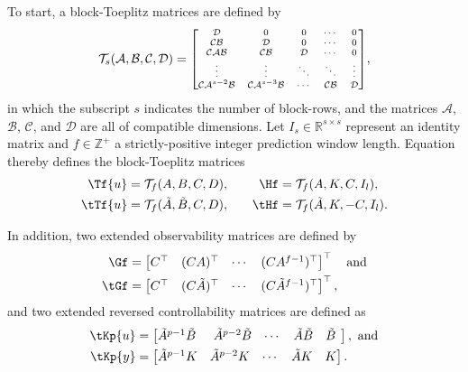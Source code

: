 To start, a block-Toeplitz matrices are defined by
\begin{align}\label{eqn:blockToeplitz} 
\mathcal{T}_s(\mathcal{A},\mathcal{B},\mathcal{C},\mathcal{D}) =\scriptsize{
	\begin{bmatrix}
		\mathcal{D}         & 0         & 0      & \cdots  & 0\\
		\mathcal{C}\mathcal{B}        & \mathcal{D}         & 0      & \cdots  & 0\\
		\mathcal{C}\mathcal{A}\mathcal{B}       & \mathcal{C}\mathcal{B}        & \mathcal{D}      & \cdots & 0\\
		\vdots    &  \vdots & \ddots & \ddots & \vdots\\
		\mathcal{C}\mathcal{A}^{s-2}\mathcal{B} & \mathcal{C}\mathcal{A}^{s-3}\mathcal{B} & \cdots  & \mathcal{C}\mathcal{B}     & \mathcal{D}
	\end{bmatrix}},
\end{align}
in which the subscript $s$ indicates the number of block-rows, and the matrices $\mathcal{A}$, $\mathcal{B}$, $\mathcal{C}$, and $\mathcal{D}$ are all of compatible dimensions. Let $I_s\in\mathbb{R}^{s\times s}$ represent an identity matrix and $f\in\mathbb{Z}^+$ a strictly-positive integer prediction window length. Equation~ thereby defines the block-Toeplitz matrices
\begin{alignat*}{2}
\Tf{u}&=\mathcal{T}_f(A,B,C,D),\quad  &\Hf&=\mathcal{T}_f(A,K,C,I_l),\\
\tTf{u}&=\mathcal{T}_f(\tilde{A},\tilde{B},C,D),\quad  &\tHf&=\mathcal{T}_f(\tilde{A},K,-C,I_l).
\end{alignat*}

In addition, two extended observability matrices are defined by
\begin{align*}
\Gf &= \begin{bmatrix}C^\top & (CA)^\top & \cdots & (CA^{f-1})^\top\end{bmatrix}^\top\quad\text{and}\\
\tGf &= \begin{bmatrix}C^\top & (C\tilde{A})^\top & \cdots & (C\tilde{A}^{f-1})^\top\end{bmatrix}^\top,
\end{align*}
and two extended reversed controllability matrices are defined as 
\begin{align*}
\tKp{u} &= \begin{bmatrix} \tilde{A}^{p-1}\tilde{B}\:\, & \tilde{A}^{p-2}\tilde{B} & \cdots & \tilde{A}\tilde{B} & \tilde{B}\:\, \end{bmatrix},\text{ and}\\
\tKp{y} &= \begin{bmatrix} \tilde{A}^{p-1}K & \tilde{A}^{p-2}K & \cdots & \tilde{A}K & K \end{bmatrix}.
\end{align*}

